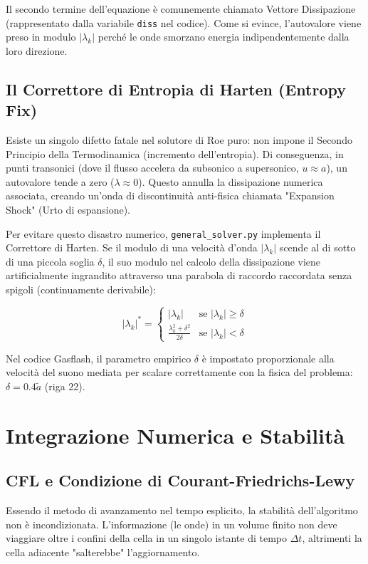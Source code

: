 \documentclass[11pt,a4paper]{article}
\begin{document}
Il secondo termine dell'equazione è comunemente chiamato Vettore Dissipazione (rappresentato dalla variabile \texttt{diss} nel codice). Come si evince, l'autovalore viene preso in modulo $|\lambda_k|$ perché le onde smorzano energia indipendentemente dalla loro direzione.

\subsection{Il Correttore di Entropia di Harten (Entropy Fix)}
Esiste un singolo difetto fatale nel solutore di Roe puro: non impone il Secondo Principio della Termodinamica (incremento dell'entropia). Di conseguenza, in punti transonici (dove il flusso accelera da subsonico a supersonico, $u \approx a$), un autovalore tende a zero ($\lambda \approx 0$). Questo annulla la dissipazione numerica associata, creando un'onda di discontinuità anti-fisica chiamata "Expansion Shock" (Urto di espansione).

Per evitare questo disastro numerico, \texttt{general\_solver.py} implementa il Correttore di Harten. Se il modulo di una velocità d'onda $|\lambda_k|$ scende al di sotto di una piccola soglia $\delta$, il suo modulo nel calcolo della dissipazione viene artificialmente ingrandito attraverso una parabola di raccordo raccordata senza spigoli (continuamente derivabile):

\begin{equation}
|\lambda_k|^* = 
\begin{cases} 
|\lambda_k| & \text{se } |\lambda_k| \geq \delta \\
\frac{\lambda_k^2 + \delta^2}{2\delta} & \text{se } |\lambda_k| < \delta 
\end{cases}
\end{equation}

Nel codice Gasflash, il parametro empirico $\delta$ è impostato proporzionale alla velocità del suono mediata per scalare correttamente con la fisica del problema: $\delta = 0.4 \tilde{a}$ (riga 22).

\section{Integrazione Numerica e Stabilità}

\subsection{CFL e Condizione di Courant-Friedrichs-Lewy}
Essendo il metodo di avanzamento nel tempo esplicito, la stabilità dell'algoritmo non è incondizionata. L'informazione (le onde) in un volume finito non deve viaggiare oltre i confini della cella in un singolo istante di tempo $\Delta t$, altrimenti la cella adiacente "salterebbe" l'aggiornamento.
\end{document}
